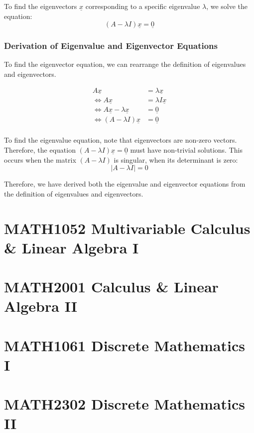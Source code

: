 \documentclass[12pt, letterpaper]{book}
\begin{document}
To find the eigenvectors $\underline{x}$ corresponding to a specific eigenvalue $\lambda$, we solve the equation:
$$(A - \lambda I) \underline{x} = \underline{0}$$

\section{Derivation of Eigenvalue and Eigenvector Equations}

To find the eigenvector equation, we can rearrange the definition of eigenvalues and eigenvectors. 

$$
\begin{aligned}
A \underline{x} &= \lambda \underline{x} \\
\iff A \underline{x} &= \lambda I \underline{x} \\
\iff A \underline{x} - \lambda \underline{x} &= \underline{0} \\
\iff (A - \lambda I) \underline{x} &= \underline{0} \\
\end{aligned}
$$

To find the eigenvalue equation, note that eigenvectors are non-zero vectors. Therefore, the equation $(A - \lambda I) \underline{x} = \underline{0}$ must have non-trivial solutions. This occurs when the matrix $(A - \lambda I)$ is singular, when its determinant is zero:
$$|A - \lambda I| = 0$$

Therefore, we have derived both the eigenvalue and eigenvector equations from the definition of eigenvalues and eigenvectors.

\part{MATH1052 Multivariable Calculus \& Linear Algebra I}

\part{MATH2001 Calculus \& Linear Algebra II}

\part{MATH1061 Discrete Mathematics I}

\part{MATH2302 Discrete Mathematics II}
\end{document}
